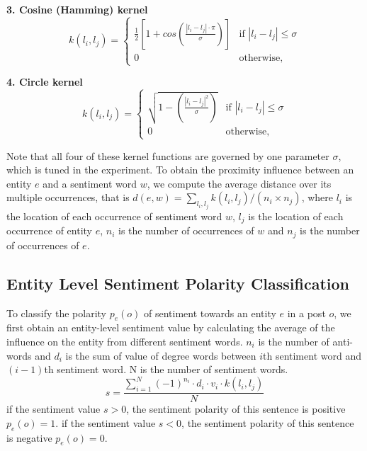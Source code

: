 \documentclass[runningheads]{llncs}
\begin{document}
\textbf{3. Cosine (Hamming) kernel}
\begin{equation}
k(l_i,l_j)=\begin{cases}
\frac{1}{2}\left[1+cos\left(\frac{|l_i-l_j|\cdot\pi}{\sigma}\right)\right] &\mbox{if $|l_i-l_j|\leq \sigma$}\\
0 &\mbox{otherwise},
\end{cases}
\end{equation}

\textbf{4. Circle kernel}
\begin{equation}
k(l_i,l_j)=\begin{cases}
\sqrt{1-\left(\frac{|l_i-l_j|^2}{\sigma}\right)} &\mbox{if $|l_i-l_j|\leq \sigma$}\\
0 &\mbox{otherwise},
\end{cases}
\end{equation}

Note that all four of these kernel functions are governed by one parameter $\sigma$, which is tuned in the experiment.
To obtain the proximity influence between an entity $e$ and a sentiment word $w$, we compute the average distance over its multiple occurrences, that is $d(e,w)=\sum_{l_i,l_j} k(l_i,l_j)/(n_i\times n_j)$, where $l_i$ is the location of each occurrence of sentiment word $w$, $l_j$ is the location of each occurrence of entity $e$, $n_i$ is the number of occurrences of $w$ and $n_j$ is the number of occurrences of $e$.

\subsection{Entity Level Sentiment Polarity Classification}

To classify the polarity $p_e(o)$ of sentiment towards an entity $e$ in a post $o$, we first obtain an entity-level sentiment value by calculating the average of the influence  on the entity from different sentiment words. $n_i$ is the number of anti-words and $d_i$ is the sum of value of degree words between $i$th sentiment word and $(i-1)$th sentiment word. N is the number of sentiment words.
\begin{equation}\label{equ:entitysentiment}
s = \frac{\sum_{i=1}^{N}(-1)^{n_i}\cdot d_i\cdot v_i\cdot k(l_i,l_j)}{N}
\end{equation}
if the sentiment value $s>0$, the sentiment polarity of this sentence is positive $p_e(o)=1$. if the sentiment value $s<0$, the sentiment polarity of this sentence is negative $p_e(o)=0$. 
\end{document}
